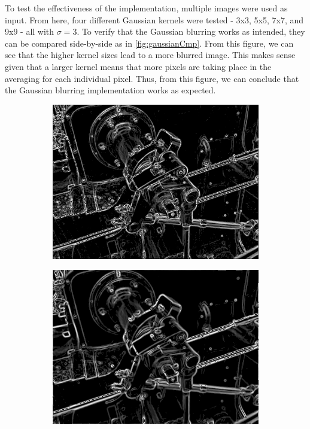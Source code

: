 \documentclass[12pt]{article}
\begin{document}
		To test the effectiveness of the implementation, multiple images were used as input. From here, four different Gaussian kernels were tested - 3x3, 5x5, 7x7, and 9x9 - all with $\sigma = 3$. To verify that the Gaussian blurring works as intended, they can be compared side-by-side as in \autoref{fig:gaussianCmp}. From this figure, we can see that the higher kernel sizes lead to a more blurred image. This makes sense given that a larger kernel means that more pixels are taking place in the averaging for each individual pixel. Thus, from this figure, we can conclude that the Gaussian blurring implementation works as expected.

		\begin{figure}[H]
			\centering
			\begin{subfigure}[b]{0.45\linewidth}
				\includegraphics[width=1\linewidth,keepaspectratio]{../examples/valve/valve_gaussian-3x3_thresh-25}
				\subcaption{}
				\label{fig:sobelGaussianCmp3x3}
			\end{subfigure} %
			\begin{subfigure}[b]{0.45\linewidth}
				\includegraphics[width=1\linewidth,keepaspectratio]{../examples/valve/valve_gaussian-5x5_thresh-25}

\end{subfigure}
\end{figure}
\end{document}

